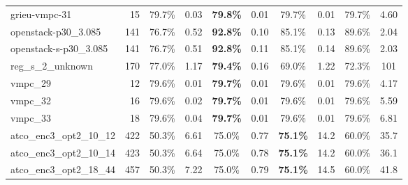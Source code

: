\documentclass{llncs}
\begin{document}
\begin{table}
\begin{center}
\begin{tabular}{|l|r|c|c|c|c|c|c|c|c|}
grieu-vmpc-31            &  15  & 79.7\% & 0.03 & \textbf{79.8\%} & 0.01 & 79.7\% & 0.01 & 79.7\% & 4.60  \\
openstack-p30\_3.085     &  141 & 76.7\% & 0.52 & \textbf{92.8\%} & 0.10 & 85.1\% & 0.13 & 89.6\% & 2.04  \\
openstack-s-p30\_3.085   &  141 & 76.7\% & 0.51 & \textbf{92.8\%} & 0.11 & 85.1\% & 0.14 & 89.6\% & 2.03  \\
reg\_s\_2\_unknown       &  170 & 77.0\% & 1.17 & \textbf{79.4\%} & 0.16 & 69.0\% & 1.22 & 72.3\% & 101   \\

vmpc\_29                 & 12   & 79.6\% & 0.01 & \textbf{79.7\%} & 0.01 & 79.6\% & 0.01 & 79.6\% & 4.17 \\
vmpc\_32                 & 16   & 79.6\% & 0.02 & \textbf{79.7\%} & 0.01 & 79.6\% & 0.01 & 79.6\% & 5.59 \\
vmpc\_33                 & 18   & 79.6\% & 0.04 & \textbf{79.7\%} & 0.01 & 79.6\% & 0.01 & 79.6\% & 6.81 \\

atco\_enc3\_opt2\_10\_12 & 422  & 50.3\% & 6.61 & 75.0\% & 0.77 & \textbf{75.1\%} & 14.2 & 60.0\% & 35.7 \\
atco\_enc3\_opt2\_10\_14 & 423  & 50.3\% & 6.64 & 75.0\% & 0.78 & \textbf{75.1\%} & 14.2 & 60.0\% & 36.1 \\
atco\_enc3\_opt2\_18\_44 & 457  & 50.3\% & 7.22 & 75.0\% & 0.79 & \textbf{75.1\%} & 14.5 & 60.0\% & 41.8 \\


\end{tabular}
\end{center}
\end{table}
\end{document}
